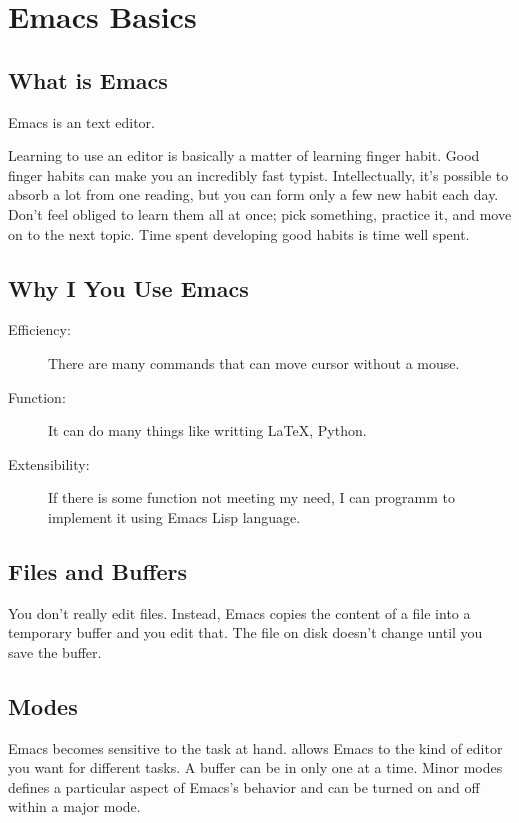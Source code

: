 \chapter{Emacs Basics}
\section{What is Emacs}
Emacs is an text editor.

\begin{tcolorbox}
Learning to use an editor is basically a matter of learning finger habit. Good finger habits can make you an incredibly fast typist. Intellectually, it's possible to absorb a lot from one reading, but you can form only a few new habit each day. Don't feel obliged  to learn them all at once; pick something, practice it, and move on to the next topic. Time spent developing good habits is time well spent.
\end{tcolorbox}

\section{Why I You Use Emacs}
\begin{description}
  \item [Efficiency:] There are many commands that can move cursor without a mouse.
  \item [Function:] It can do many things like writting LaTeX, Python.
  \item [Extensibility:] If there is some function not meeting my need, I can programm to implement it using Emacs Lisp language.
\end{description}

\section{Files and Buffers}
You don't really edit files. Instead, Emacs copies the content of a file into a temporary buffer and you edit that. The file on disk doesn't change until you save the buffer.

\section{Modes}
Emacs becomes sensitive to the task at hand.  allows Emacs to the kind of editor you want for different tasks. A buffer can be in only one  at a time. Minor modes defines a particular aspect of Emacs's behavior and can be turned on and off within a major mode.

